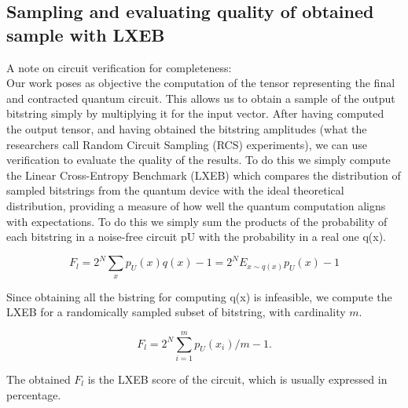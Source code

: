 \documentclass[12pt,oneside,a4paper]{article}
\begin{document}
\subsection{Sampling and evaluating quality of obtained sample with LXEB}
A note on circuit verification for completeness:\\
Our work poses as objective the computation of the tensor representing the final and contracted quantum circuit. This allows us to obtain a sample of the output bitstring simply by multiplying it for the input vector. After having computed the output tensor, and having obtained the bitstring amplitudes (what the researchers call Random Circuit Sampling (RCS) experiments), we can use verification to evaluate the quality of the results. To do this we simply compute the Linear Cross-Entropy Benchmark (LXEB) which compares the distribution of sampled bitstrings from the quantum device with the ideal theoretical distribution, providing a measure of how well the quantum computation aligns with expectations. To do this we simply sum the products of the probability of each bitstring in a noise-free circuit pU with the probability in a real one q(x).

\begin{equation}
    F_l = 2^N \sum_x p_U(x)q(x) - 1 = 2^N E_{x \sim q(x)} p_U(x) - 1
\end{equation}

Since obtaining all the bistring for computing q(x) is infeasible, we compute the LXEB for a randomically sampled subset of bitstring, with cardinality $m$.

\begin{equation}
    F_l = 2^N \sum_{i=1}^m p_U(x_i)/m - 1.
\end{equation}

The obtained $F_l$ is the LXEB score of the circuit, which is usually expressed in percentage.
\end{document}
